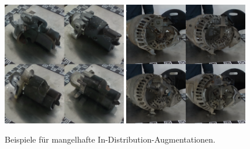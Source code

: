 \begin{figure}[h]
  \centering
  \includegraphics[width=0.48\textwidth]{figure_results_id-augs_bad_1.png}%
  \hspace{0.02\textwidth}\includegraphics[width=0.48\textwidth]{figure_results_id-augs_bad_2.png}
  \caption{Beispiele für mangelhafte In-Distribution-Augmentationen.}
  \label{fig:id-augs-bad}
\end{figure}

